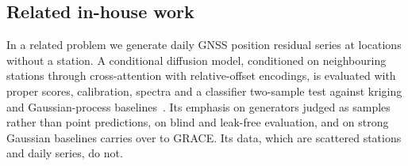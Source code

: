 \subsection{Related in-house work}

In a related problem we generate daily GNSS position residual series at locations without a station. A conditional diffusion model, conditioned on neighbouring stations through cross-attention with relative-offset encodings, is evaluated with proper scores, calibration, spectra and a classifier two-sample test against kriging and Gaussian-process baselines~\cite{imonet}. Its emphasis on generators judged as samples rather than point predictions, on blind and leak-free evaluation, and on strong Gaussian baselines carries over to GRACE. Its data, which are scattered stations and daily series, do not.
